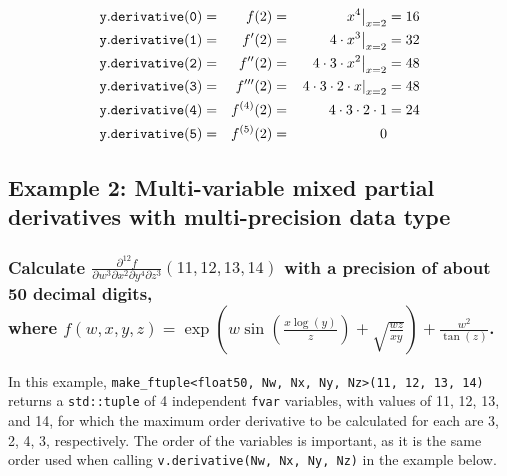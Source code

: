 \documentclass{article}
\begin{document}
\begin{alignat*}{3}
{\tt y.derivative(0)} &=& f(2) =&& \left.x^4\right|_{x=2} &= 16\\
{\tt y.derivative(1)} &=& f'(2) =&& \left.4\cdot x^3\right|_{x=2} &= 32\\
{\tt y.derivative(2)} &=& f''(2) =&& \left.4\cdot 3\cdot x^2\right|_{x=2} &= 48\\
{\tt y.derivative(3)} &=& f'''(2) =&& \left.4\cdot 3\cdot2\cdot x\right|_{x=2} &= 48\\
{\tt y.derivative(4)} &=& f^{(4)}(2) =&& 4\cdot 3\cdot2\cdot1 &= 24\\
{\tt y.derivative(5)} &=& f^{(5)}(2) =&& 0 &
\end{alignat*}

\subsection{Example 2: Multi-variable mixed partial derivatives with multi-precision data type}
\subsubsection{Calculate $\frac{\partial^{12}f}{\partial w^{3}\partial x^{2}\partial y^{4}\partial z^{3}}(11,12,13,14)$
with a precision of about 50 decimal digits,\\
where $f(w,x,y,z)=\exp\left(w\sin\left(\frac{x\log(y)}{z}\right)+\sqrt{\frac{wz}{xy}}\right)+\frac{w^2}{\tan(z)}$.}

In this example, {\tt make\_ftuple<float50, Nw, Nx, Ny, Nz>(11, 12, 13, 14)} returns a {\tt std::tuple} of 4
independent {\tt fvar} variables, with values of 11, 12, 13, and 14, for which the maximum order derivative to
be calculated for each are 3, 2, 4, 3, respectively. The order of the variables is important, as it is the same
order used when calling {\tt v.derivative(Nw, Nx, Ny, Nz)} in the example below.
\end{document}
